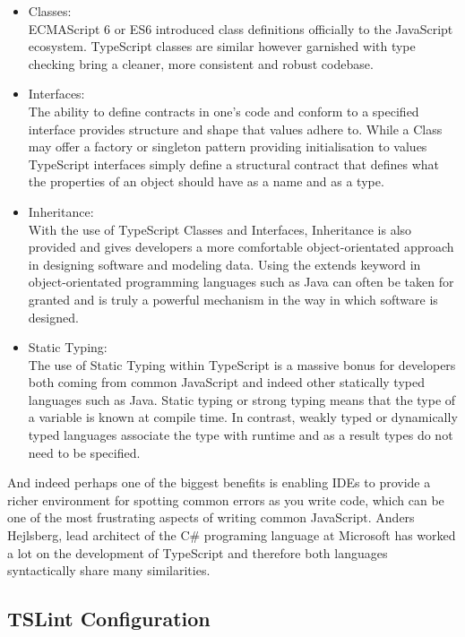 \begin{itemize}
\item{Classes:} \\
ECMAScript 6 or ES6 introduced class definitions officially to the JavaScript ecosystem. TypeScript classes are similar however garnished with type checking bring a cleaner, more consistent and robust codebase. 
\item{Interfaces:} \\
The ability to define contracts in one's code and conform to a specified interface provides structure and shape that values adhere to. While a Class may offer a factory or singleton\cite{Gamma:1995:DPE:186897} pattern providing initialisation to values TypeScript interfaces simply define a structural contract that defines what the properties of an object should have as a name and as a type.
\item{Inheritance:} \\
With the use of TypeScript Classes and Interfaces, Inheritance is also provided and gives developers a more comfortable object-orientated approach in designing software and modeling data. Using the extends keyword in object-orientated programming languages such as Java can often be taken for granted and is truly a powerful mechanism in the way in which software is designed.
\item{Static Typing:} \\
The use of Static Typing within TypeScript is a massive bonus for developers both coming from common JavaScript and indeed other statically typed languages such as Java. Static typing or strong typing means that the type of a variable is known at compile time. In contrast, weakly typed or dynamically typed languages associate the type with runtime and as a result types do not need to be specified.
\end{itemize}

And indeed perhaps one of the biggest benefits is enabling IDEs to provide a richer environment for spotting common errors as you write code, which can be one of the most frustrating aspects of writing common JavaScript. Anders Hejlsberg, lead architect of the C\# programing language at Microsoft has worked a lot on the development of TypeScript and therefore both languages syntactically share many similarities\cite{andershejlsberg}.

\subsection{TSLint Configuration}

